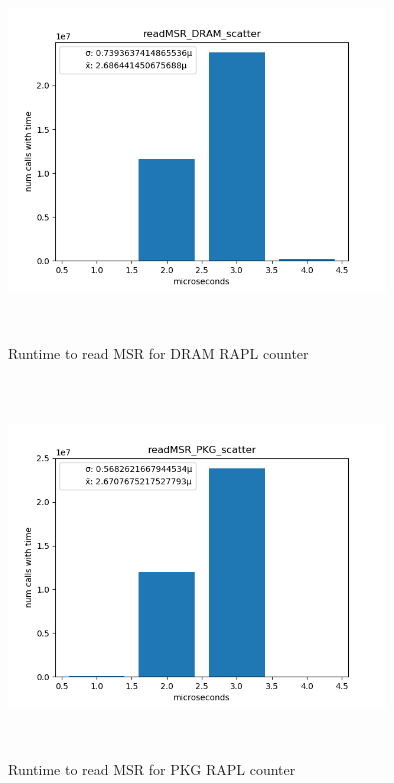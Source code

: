     \begin{figure}[H]
	    \centering
	    \includegraphics[width=10cm,height=10cm,keepaspectratio]{jmh/readmsr-runtime/readMSR_DRAM_scatter.png}
	    \caption{Runtime to read MSR for DRAM RAPL counter}
	    \label{fig:DRAM-rapl-counter}
    \end{figure}
    
    \begin{figure}[H]
	    \centering
	    \includegraphics[width=10cm,height=10cm,keepaspectratio]{jmh/readmsr-runtime/readMSR_PKG_scatter.png}
	    \caption{Runtime to read MSR for PKG RAPL counter}
	    \label{fig:PKG-rapl-counter}
    \end{figure}
    
